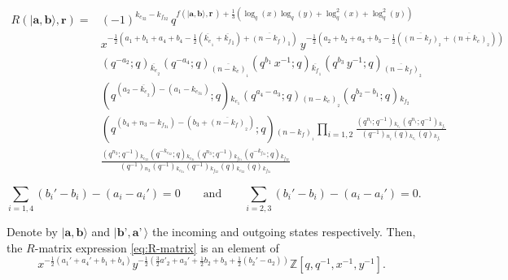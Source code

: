 \documentclass[10pt,a4paper]{amsart}
\begin{document}
\begin{equation}\label{eq:R-matrix}
    \begin{split}
    R\left(|\textbf{a},\textbf{b}\rangle,\textbf{r}\right) = 
    &(-1)^{k_{e_{32}}-k_{f_{32}}} \,q^{f\left(|\textbf{a},\textbf{b}\rangle,\textbf{r}\,\right) + \frac{1}{3} \left(\log_q (x) \log_q (y)+\log_q ^2(x)+\log_q ^2(y)\right)} 
    \\& x^{-\frac{1}{2}(a_1+b_1+a_4+b_4-\frac{1}{2}(\overline{k_e}_{{}_1}+\overline{k_f}_{1})+\overline{(n-k_f)}_{1})} \, y^{-\frac{1}{2}(a_2+b_2+a_3+b_3-\frac{1}{2}(\overline{(n-k_f)}_{{}_2}+\overline{(n+k_e)}_{{}_2}))}
    \\& \left(q^{-a_2};q\right){}_{\overline{k_e}_{{}_2}} \left(q^{- a_4};q\right){}_{\overline{\left(n-k_{e}\right)}_{{}_1}} \left(q^{ b_1}\,x^{-1};q\right){}_{\overline{k_f}_{{}_1}} \left(q^{b_3}\,y^{-1};q\right){}_{\overline{(n-k_{f})}_{{}_2}}  
    \\& \left(q^{(a_2-\overline{k_e}_{{}_2})-(a_1-k_{e_{31}})};q\right){}_{k_{e_1}} \left(q^{a_4-a_3};q\right){}_{(n-k_e)_{{}_2}} \left(q^{b_2-b_1};q\right){}_{k_{f_2}} 
    \\& \left(q^{(b_4+n_3-k_{f_{31}})-(b_3+\overline{(n-k_{f})}_{{}_2})};q\right){}_{(n-k_f)_{{}_1}}
    \prod_{i=1,2} \frac{\left(q^{n_i};q^{-1}\right){}_{k_{e_i}}\left(q^{n_i};q^{-1}\right){}_{k_{f_i}}}{\left(q^{-1}\right){}_{n_i}\left(q\right){}_{k_{e_i}}\left(q\right){}_{k_{f_i}}} 
    \\&\frac{\left(q^{n_3};q^{-1}\right){}_{k_{e_{32}}}\left(q^{-k_{e_{32}}};q\right){}_{k_{e_{31}}}\left(q^{n_3};q^{-1}\right){}_{k_{f_{31}}}\left(q^{-k_{f_{31}}};q\right){}_{k_{f_{32}}}}{\left(q^{-1}\right){}_{n_3}\left(q^{-1}\right){}_{k_{e_{31}}}\left(q^{-1}\right){}_{k_{f_{32}}}\left(q\right){}_{k_{e_{32}}}\left(q\right){}_{k_{f_{31}}}}
    \end{split}
\end{equation}

\begin{equation}\label{eq:conservation-rels}
    \sum_{i=1,4} (b_i'-b_i)-(a_i-a_i')=0 \qquad \text{and} \qquad \sum_{i=2,3} (b_i'-b_i)-(a_i-a_i')=0.
\end{equation}

\begin{lema}\label{lemma:proof-1} Denote by $|\textbf{a},\textbf{b}\rangle$ and $|\textbf{b'},\textbf{a'}\,\rangle$ the incoming and outgoing states respectively. Then, the $R$-matrix expression \eqref{eq:R-matrix} is an element of $$x^{-\frac{1}{2}(a_1'+a_4'+b_1+b_4)}y^{-\frac{1}{2}\left(\frac{3}{2}a'_2+a_3'+\frac{1}{2}b_2+b_3+\frac{1}{2}\left(b_2'-a_2\right)\right)}\mathbb{Z}[q,q^{-1},x^{-1},y^{-1}].$$
\end{lema}
\end{document}
